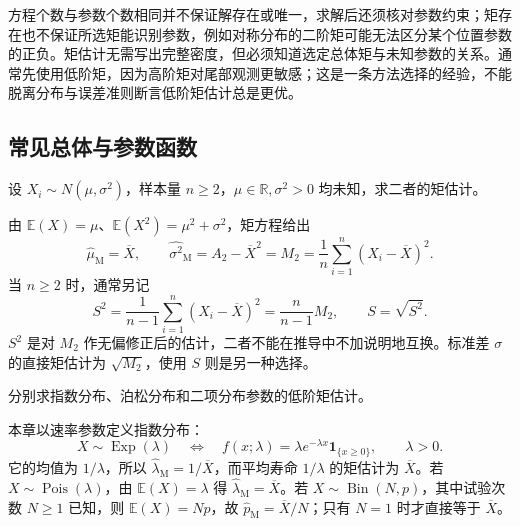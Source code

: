 方程个数与参数个数相同并不保证解存在或唯一，求解后还须核对参数约束；矩存在也不保证所选矩能识别参数，例如对称分布的二阶矩可能无法区分某个位置参数的正负。矩估计无需写出完整密度，但必须知道选定总体矩与未知参数的关系。通常先使用低阶矩，因为高阶矩对尾部观测更敏感；这是一条方法选择的经验，不能脱离分布与误差准则断言低阶矩估计总是更优。

\subsection{常见总体与参数函数}

\begin{example}
\label{ex:study-normal-moments}
设 $X_i\sim N(\mu,\sigma^2)$，样本量 $n\ge2$，$\mu\in\mathbb R,\sigma^2>0$ 均未知，求二者的矩估计。
\end{example}

\begin{solve}
由 $\mathbb E(X)=\mu$、$\mathbb E(X^2)=\mu^2+\sigma^2$，矩方程给出
\begin{equation}
  \widehat\mu_{\mathrm M}=\overline X,\qquad
  \widehat{\sigma^2}_{\mathrm M}=A_2-\overline X^2
    =M_2=\frac1n\sum_{i=1}^n(X_i-\overline X)^2.
  \label{eq:study-normal-moment-estimates}
\end{equation}
当 $n\ge2$ 时，通常另记
\begin{equation}
  S^2=\frac1{n-1}\sum_{i=1}^n(X_i-\overline X)^2
     =\frac n{n-1}M_2,\qquad S=\sqrt{S^2}.
  \label{eq:study-unbiased-sample-variance}
\end{equation}
$S^2$ 是对 $M_2$ 作无偏修正后的估计，二者不能在推导中不加说明地互换。标准差 $\sigma$ 的直接矩估计为 $\sqrt{M_2}$，使用 $S$ 则是另一种选择。
\end{solve}

\begin{example}
\label{ex:study-rate-moments}
分别求指数分布、泊松分布和二项分布参数的低阶矩估计。
\end{example}

\begin{solve}
本章以速率参数定义指数分布：
\begin{equation}
  X\sim\operatorname{Exp}(\lambda)
  \quad\Longleftrightarrow\quad
  f(x;\lambda)=\lambda e^{-\lambda x}\mathbf1_{\{x\ge0\}},
  \qquad \lambda>0.
  \label{eq:study-exponential-rate}
\end{equation}
它的均值为 $1/\lambda$，所以 $\widehat\lambda_{\mathrm M}=1/\overline X$，而平均寿命 $1/\lambda$ 的矩估计为 $\overline X$。若 $X\sim\operatorname{Pois}(\lambda)$，由 $\mathbb E(X)=\lambda$ 得 $\widehat\lambda_{\mathrm M}=\overline X$。若 $X\sim\operatorname{Bin}(N,p)$，其中试验次数 $N\ge1$ 已知，则 $\mathbb E(X)=Np$，故 $\widehat p_{\mathrm M}=\overline X/N$；只有 $N=1$ 时才直接等于 $\overline X$。
\end{solve}

